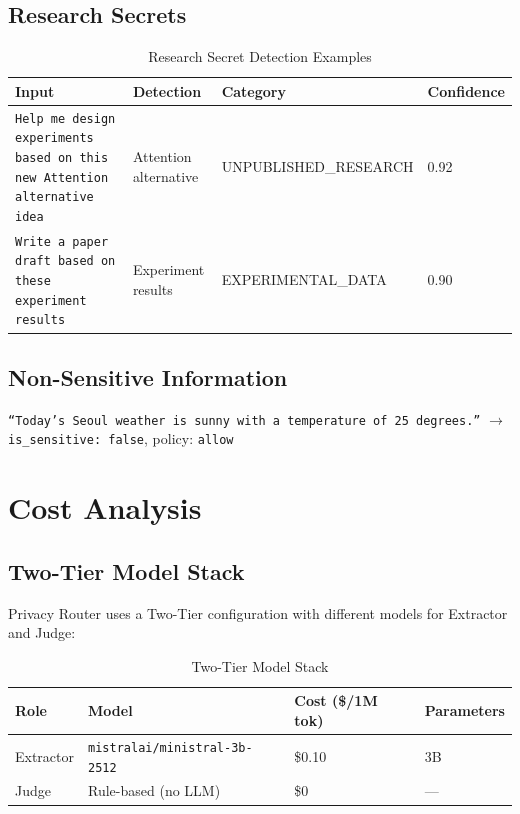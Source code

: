 \documentclass[11pt,a4paper]{article}
\begin{document}
\subsection{Research Secrets}

\begin{table}[h]
\centering
\begin{tabular}{@{}p{5cm}lll@{}}
\toprule
Input & Detection & Category & Confidence \\
\midrule
\texttt{Help me design experiments based on this new Attention alternative idea} & Attention alternative & UNPUBLISHED\_RESEARCH & 0.92 \\
\texttt{Write a paper draft based on these experiment results} & Experiment results & EXPERIMENTAL\_DATA & 0.90 \\
\bottomrule
\end{tabular}
\caption{Research Secret Detection Examples}
\end{table}

\subsection{Non-Sensitive Information}

\texttt{``Today's Seoul weather is sunny with a temperature of 25 degrees.''} $\rightarrow$ \texttt{is\_sensitive: false}, policy: \texttt{allow}

\section{Cost Analysis}

\subsection{Two-Tier Model Stack}

Privacy Router uses a Two-Tier configuration with different models for Extractor and Judge:

\begin{table}[h]
\centering
\begin{tabular}{@{}llll@{}}
\toprule
Role & Model & Cost (\$/1M tok) & Parameters \\
\midrule
Extractor & \texttt{mistralai/ministral-3b-2512} & \$0.10 & 3B \\
Judge & Rule-based (no LLM) & \$0 & --- \\
\bottomrule
\end{tabular}
\caption{Two-Tier Model Stack}
\end{table}
\end{document}
